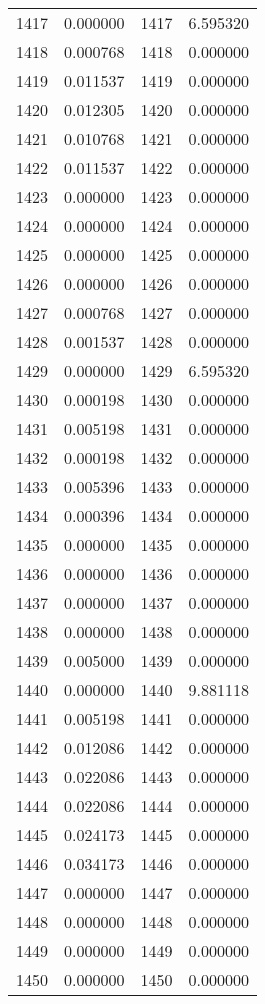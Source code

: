 \documentclass[12pt]{article}
\begin{document}
\begin{longtable}{@{}cccc@{}}
1417 & 0.000000 & 1417 & 6.595320 \\
1418 & 0.000768 & 1418 & 0.000000 \\
1419 & 0.011537 & 1419 & 0.000000 \\
1420 & 0.012305 & 1420 & 0.000000 \\
1421 & 0.010768 & 1421 & 0.000000 \\
1422 & 0.011537 & 1422 & 0.000000 \\
1423 & 0.000000 & 1423 & 0.000000 \\
1424 & 0.000000 & 1424 & 0.000000 \\
1425 & 0.000000 & 1425 & 0.000000 \\
1426 & 0.000000 & 1426 & 0.000000 \\
1427 & 0.000768 & 1427 & 0.000000 \\
1428 & 0.001537 & 1428 & 0.000000 \\
1429 & 0.000000 & 1429 & 6.595320 \\
1430 & 0.000198 & 1430 & 0.000000 \\
1431 & 0.005198 & 1431 & 0.000000 \\
1432 & 0.000198 & 1432 & 0.000000 \\
1433 & 0.005396 & 1433 & 0.000000 \\
1434 & 0.000396 & 1434 & 0.000000 \\
1435 & 0.000000 & 1435 & 0.000000 \\
1436 & 0.000000 & 1436 & 0.000000 \\
1437 & 0.000000 & 1437 & 0.000000 \\
1438 & 0.000000 & 1438 & 0.000000 \\
1439 & 0.005000 & 1439 & 0.000000 \\
1440 & 0.000000 & 1440 & 9.881118 \\
1441 & 0.005198 & 1441 & 0.000000 \\
1442 & 0.012086 & 1442 & 0.000000 \\
1443 & 0.022086 & 1443 & 0.000000 \\
1444 & 0.022086 & 1444 & 0.000000 \\
1445 & 0.024173 & 1445 & 0.000000 \\
1446 & 0.034173 & 1446 & 0.000000 \\
1447 & 0.000000 & 1447 & 0.000000 \\
1448 & 0.000000 & 1448 & 0.000000 \\
1449 & 0.000000 & 1449 & 0.000000 \\
1450 & 0.000000 & 1450 & 0.000000 \\

\end{longtable}
\end{document}
